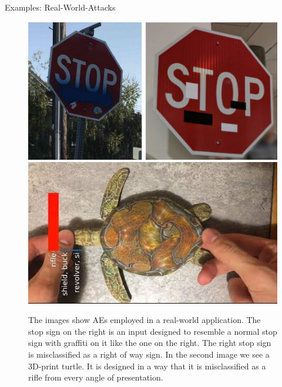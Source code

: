 \documentclass[11pt,compress,t,notes=noshow, xcolor=table]{beamer}
\begin{document}
\begin{vbframe}{Examples: Real-World-Attacks}
\begin{figure}[h]
\centering
\includegraphics[width=0.46\linewidth]{figure/AEstop.png}\quad \includegraphics[width=0.45\linewidth]{figure/AEturtle.jpg}
  \caption{The images show AEs employed in a real-world application. The stop sign on the right is an input designed to resemble a normal stop sign with graffiti on it like the one on the right. The right stop sign is misclassified as a right of way sign. In the second image we see a 3D-print turtle. It is designed in a way that it is misclassified as a rifle from every angle of presentation.}
  \label{fig:mnist}
\end{figure} 


\end{vbframe}
\end{document}
